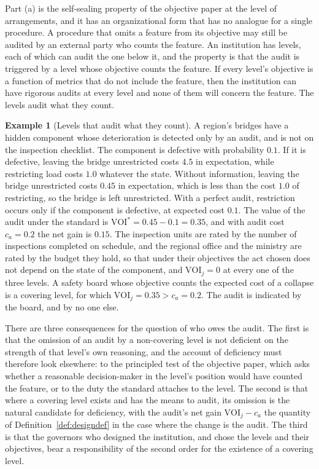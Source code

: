 \documentclass[11pt]{article}
\newcommand{\VOI}{\mathrm{VOI}}
\theoremstyle{plain}
\theoremstyle{definition}
\newtheorem{example}{Example}
\begin{document}
Part (a) is the self-sealing property of the objective paper at the level of arrangements, and it has an organizational form that has no analogue for a single procedure. A procedure that omits a feature from its objective may still be audited by an external party who counts the feature. An institution has levels, each of which can audit the one below it, and the property is that the audit is triggered by a level whose objective counts the feature. If every level's objective is a function of metrics that do not include the feature, then the institution can have rigorous audits at every level and none of them will concern the feature. The levels audit what they count.

\begin{example}[Levels that audit what they count]\label{ex:cover}
A region's bridges have a hidden component whose deterioration is detected only by an audit, and is not on the inspection checklist. The component is defective with probability $0.1$. If it is defective, leaving the bridge unrestricted costs $4.5$ in expectation, while restricting load costs $1.0$ whatever the state. Without information, leaving the bridge unrestricted costs $0.45$ in expectation, which is less than the cost $1.0$ of restricting, so the bridge is left unrestricted. With a perfect audit, restriction occurs only if the component is defective, at expected cost $0.1$. The value of the audit under the standard is $\VOI^*=0.45-0.1=0.35$, and with audit cost $c_a=0.2$ the net gain is $0.15$. The inspection units are rated by the number of inspections completed on schedule, and the regional office and the ministry are rated by the budget they hold, so that under their objectives the act chosen does not depend on the state of the component, and $\VOI_j=0$ at every one of the three levels. A safety board whose objective counts the expected cost of a collapse is a covering level, for which $\VOI_j=0.35>c_a=0.2$. The audit is indicated by the board, and by no one else.
\end{example}

There are three consequences for the question of who owes the audit. The first is that the omission of an audit by a non-covering level is not deficient on the strength of that level's own reasoning, and the account of deficiency must therefore look elsewhere: to the principled test of the objective paper, which asks whether a reasonable decision-maker in the level's position would have counted the feature, or to the duty the standard attaches to the level. The second is that where a covering level exists and has the means to audit, its omission is the natural candidate for deficiency, with the audit's net gain $\VOI_j-c_a$ the quantity of Definition~\ref{def:designdef} in the case where the change is the audit. The third is that the governors who designed the institution, and chose the levels and their objectives, bear a responsibility of the second order for the existence of a covering level.
\end{document}
